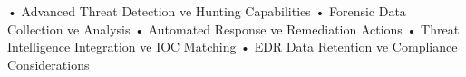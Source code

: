 • Advanced Threat Detection ve Hunting Capabilities
• Forensic Data Collection ve Analysis
• Automated Response ve Remediation Actions
• Threat Intelligence Integration ve IOC Matching
• EDR Data Retention ve Compliance Considerations